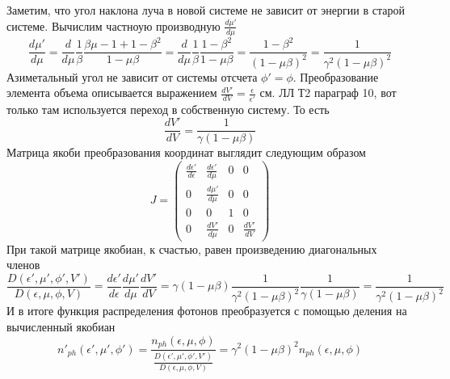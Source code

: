 \documentclass[a4paper,12pt]{jpconf}
\begin{document}
	Заметим, что угол наклона луча в новой системе не зависит от энергии в старой системе. Вычислим частноую производную $\frac{d\mu'}{d\mu}$
	\begin{equation}
		\frac{d\mu'}{d\mu}=\frac{d}{d\mu}\frac{1}{\beta}\frac{\beta\mu-1+1-\beta^2}{1-\mu\beta}=\frac{d}{d\mu}\frac{1}{\beta}\frac{1-\beta^2}{1-\mu\beta}=\frac{1-\beta^2}{(1-\mu\beta)^2}=\frac{1}{\gamma^2(1-\mu\beta)^2}
	\end{equation}
	Азиметальный угол не зависит от системы отсчета $\phi' = \phi$. Преобразование элемента объема описывается выражением $\frac{dV'}{dV} = \frac{\epsilon}{\epsilon'}$ см. ЛЛ Т2 параграф 10, вот только там используется переход в собственную систему. То есть
	\begin{equation}
		\frac{dV'}{dV} = \frac{1}{\gamma(1-\mu\beta)}
	\end{equation}
	Матрица якоби преобразования координат выглядит следующим образом
	\begin{equation}
		J=\left(
		\begin{array}{cccc}
			\frac{d\epsilon'}{d\epsilon} & \frac{d\epsilon'}{d\mu}& 0 & 0\\
			0 & \frac{d\mu'}{d\mu} & 0 & 0\\
			0 & 0 & 1 & 0\\
			0 & \frac{dV'}{d\mu} & 0 & \frac{dV'}{dV}
		\end{array}
		\right)
	\end{equation}
	При такой матрице якобиан, к счастью, равен произведению диагональных членов
	\begin{equation}\label{jacobian_ph}
		\frac{D(\epsilon',\mu',\phi',V')}{D(\epsilon,\mu,\phi,V)}=\frac{d\epsilon'}{d\epsilon}\frac{d\mu'}{d\mu}\frac{dV'}{dV}=\gamma(1-\mu\beta)\frac{1}{\gamma^2(1-\mu\beta)^2}\frac{1}{\gamma(1-\mu\beta)}=\frac{1}{\gamma^2(1-\mu\beta)^2}
	\end{equation}
	И в итоге функция распределения фотонов преобразуется с помощью деления на вычисленный якобиан
	\begin{equation}\label{distribution_ph}
		n'_{ph}(\epsilon',\mu',\phi') = \frac{n_{ph}(\epsilon,\mu,\phi)}{\frac{D(\epsilon',\mu',\phi',V')}{D(\epsilon,\mu,\phi,V)}}=\gamma^2(1-\mu\beta)^2 n_{ph}(\epsilon,\mu,\phi)
	\end{equation}
\end{document}
